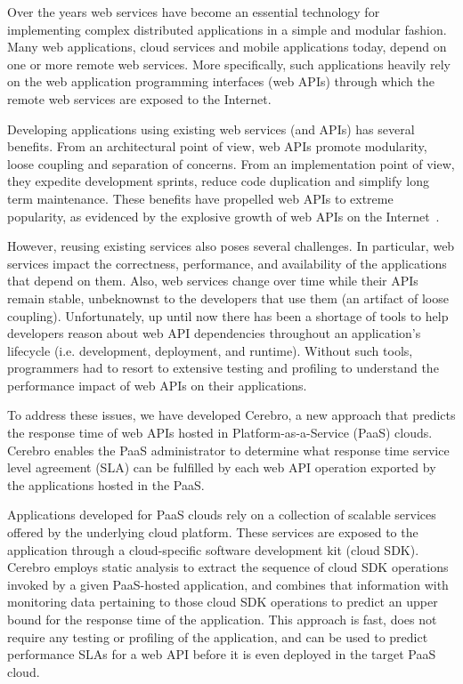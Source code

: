 Over the years web services have become an essential technology for implementing
complex distributed applications in a simple and modular fashion. Many web applications, cloud services and mobile
applications today, depend on one or more remote web services. More specifically, such
applications heavily rely on the web application programming interfaces (web APIs) through
which the remote web services are exposed to the Internet.

Developing applications using existing web services (and APIs) has several benefits. From an
architectural point of view, web APIs promote modularity, loose coupling and separation of concerns. From
an implementation point of view, they expedite development sprints, reduce code duplication and simplify
long term maintenance. These benefits have propelled web APIs to extreme popularity,
as evidenced by the explosive growth of web APIs on the Internet~\cite{pweb}. 

However, reusing existing services also poses several challenges. In particular, web services
impact the correctness, performance, and availability of the
applications that depend on them. Also, web services change over time while their APIs remain 
stable, unbeknownst to the developers that use them (an artifact of loose coupling).
Unfortunately, up until now there has been a shortage of tools to help developers 
reason about web API dependencies throughout an application's 
lifecycle (i.e. development, deployment, and runtime).  Without such tools, 
programmers had to resort to extensive testing and profiling 
to understand the performance impact of web APIs on their applications.

To address these issues, we have developed Cerebro, a new approach that
predicts the response time of web APIs hosted in Platform-as-a-Service (PaaS) clouds.
Cerebro enables the PaaS administrator to determine what response time service level 
agreement (SLA) can be fulfilled by each web API operation exported by the applications
hosted in the PaaS. 

Applications developed for PaaS clouds rely on a collection of
scalable services offered by the underlying cloud platform. These services are exposed to
the application through a cloud-specific software development kit (cloud SDK). Cerebro
employs static analysis to extract the sequence of cloud SDK operations invoked by a
given PaaS-hosted application, and combines that information with monitoring
data pertaining to those cloud SDK operations to predict an upper bound for the response
time of the application. This approach is fast, does not require any testing or profiling
of the application, and can be used to predict performance SLAs for a web API before
it is even deployed in the target PaaS cloud.

